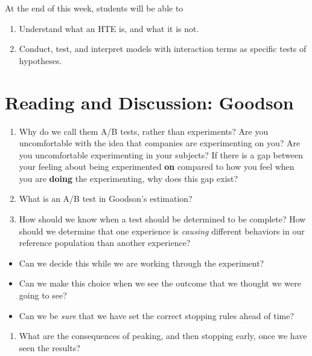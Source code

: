 \documentclass[
]{book}
\providecommand{\tightlist}{%
  \setlength{\itemsep}{0pt}\setlength{\parskip}{0pt}}
\begin{document}
At the end of this week, students will be able to

\begin{enumerate}
\def\labelenumi{\arabic{enumi}.}
\tightlist
\item
  Understand what an HTE is, and what it is not.
\item
  Conduct, test, and interpret models with interaction terms as specific
  tests of hypotheses.
\end{enumerate}

\hypertarget{reading-and-discussion-goodson}{%
\section{Reading and Discussion:
Goodson}\label{reading-and-discussion-goodson}}

\begin{enumerate}
\def\labelenumi{\arabic{enumi}.}
\tightlist
\item
  Why do we call them A/B tests, rather than experiments? Are you
  uncomfortable with the idea that companies are experimenting on you?
  Are you uncomfortable experimenting in your subjects? If there is a
  gap between your feeling about being experimented \textbf{on} compared
  to how you feel when you are \textbf{doing} the experimenting, why
  does this gap exist?
\item
  What is an A/B test in Goodson's estimation?
\item
  How should we know when a test should be determined to be complete?
  How should we determine that one experience is \emph{causing}
  different behaviors in our reference population than another
  experience?
\end{enumerate}

\begin{itemize}
\tightlist
\item
  Can we decide this while we are working through the experiment?
\item
  Can we make this choice when we see the outcome that we thought we
  were going to see?
\item
  Can we be \emph{sure} that we have set the correct stopping rules
  ahead of time?
\end{itemize}

\begin{enumerate}
\def\labelenumi{\arabic{enumi}.}
\setcounter{enumi}{3}
\tightlist
\item
  What are the consequences of peaking, and then stopping early, once we
  have seen the results?
\end{enumerate}
\end{document}
